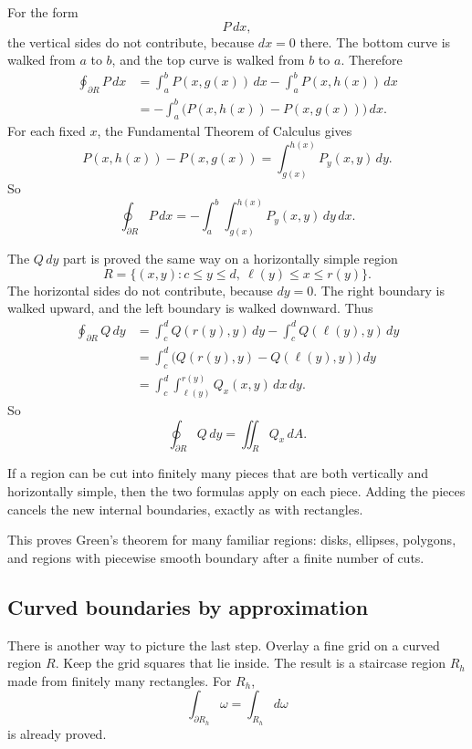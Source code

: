 For the form
\[
    P\,dx,
\]
the vertical sides do not contribute, because \(dx=0\) there.  The bottom curve is
walked from \(a\) to \(b\), and the top curve is walked from \(b\) to \(a\).  Therefore
\[
\begin{aligned}
    \oint_{\partial R}P\,dx
    &=
    \int_a^b P(x,g(x))\,dx
    -
    \int_a^b P(x,h(x))\,dx\\
    &=
    -\int_a^b\bigl(P(x,h(x))-P(x,g(x))\bigr)\,dx.
\end{aligned}
\]
For each fixed \(x\), the Fundamental Theorem of Calculus gives
\[
    P(x,h(x))-P(x,g(x))
    =
    \int_{g(x)}^{h(x)}P_y(x,y)\,dy.
\]
So
\[
\boxed{
    \oint_{\partial R}P\,dx
    =
    -\int_a^b\int_{g(x)}^{h(x)}P_y(x,y)\,dy\,dx.
}
\]

The \(Q\,dy\) part is proved the same way on a horizontally simple region
\[
    R=\{(x,y):c\le y\le d,\ \ell(y)\le x\le r(y)\}.
\]
The horizontal sides do not contribute, because \(dy=0\).  The right boundary is
walked upward, and the left boundary is walked downward.  Thus
\[
\begin{aligned}
    \oint_{\partial R}Q\,dy
    &=
    \int_c^d Q(r(y),y)\,dy
    -
    \int_c^d Q(\ell(y),y)\,dy\\
    &=
    \int_c^d\bigl(Q(r(y),y)-Q(\ell(y),y)\bigr)\,dy\\
    &=
    \int_c^d\int_{\ell(y)}^{r(y)}Q_x(x,y)\,dx\,dy.
\end{aligned}
\]
So
\[
\boxed{
    \oint_{\partial R}Q\,dy
    =
    \iint_R Q_x\,dA.
}
\]

If a region can be cut into finitely many pieces that are both vertically and horizontally
simple, then the two formulas apply on each piece.  Adding the pieces cancels the
new internal boundaries, exactly as with rectangles.

This proves Green's theorem for many familiar regions: disks, ellipses, polygons, and
regions with piecewise smooth boundary after a finite number of cuts.

\subsection{Curved boundaries by approximation}

There is another way to picture the last step.  Overlay a fine grid on a curved region
\(R\).  Keep the grid squares that lie inside.  The result is a staircase region \(R_h\)
made from finitely many rectangles.  For \(R_h\),
\[
    \int_{\partial R_h}\omega=\int_{R_h}d\omega
\]
is already proved.

